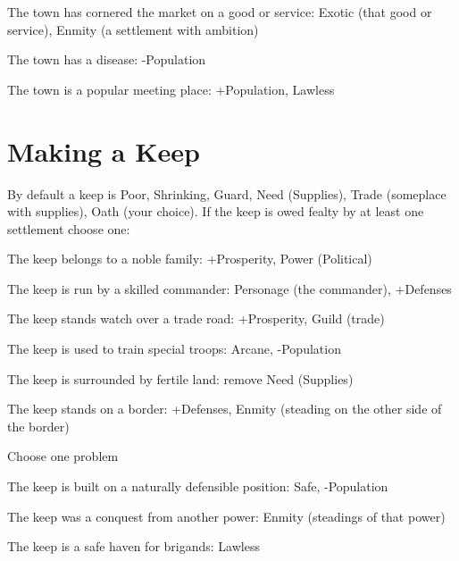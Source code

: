  
\item The town has cornered the market on a good or service: Exotic (that good or service), Enmity (a settlement with ambition)

 
\item The town has a disease: -Population

 
\item The town is a popular meeting place: +Population, Lawless


\stopitemize
 
\section{Making a Keep}  
 

By default a keep is Poor, Shrinking, Guard, Need (Supplies), Trade (someplace with supplies), Oath (your choice). If the keep is owed fealty by at least one settlement choose one:

 
\startitemize[1,packed]

\item The keep belongs to a noble family: +Prosperity, Power (Political)

 
\item The keep is run by a skilled commander: Personage (the commander), +Defenses

 
\item The keep stands watch over a trade road: +Prosperity, Guild (trade)

 
\item The keep is used to train special troops: Arcane, -Population

 
\item The keep is surrounded by fertile land: remove Need (Supplies)

 
\item The keep stands on a border: +Defenses, Enmity (steading on the other side of the border)


\stopitemize
 

Choose one problem

 
\startitemize[1,packed]

\item The keep is built on a naturally defensible position: Safe, -Population

 
\item The keep was a conquest from another power: Enmity (steadings of that power)

 
\item The keep is a safe haven for brigands: Lawless


